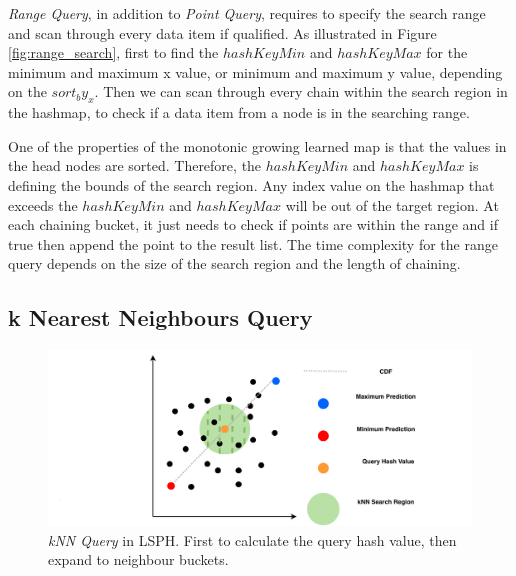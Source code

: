 \textit{Range Query}, in addition to \textit{Point Query}, requires to specify the search range and scan through every data item if qualified. As illustrated in Figure \ref{fig:range_search}, first to find the $hashKeyMin$ and $hashKeyMax$ for the minimum and maximum x value, or minimum and maximum y value, depending on the $sort_by_x$. Then we can scan through every chain within the search region in the hashmap, to check if a data item from a node is in the searching range.

One of the properties of the monotonic growing learned map is that the values in the head nodes are sorted. Therefore, the $hashKeyMin$ and $hashKeyMax$ is defining the bounds of the search region. Any index value on the hashmap that exceeds the $hashKeyMin$ and $hashKeyMax$ will be out of the target region. At each chaining bucket, it just needs to check if points are within the range and if true then append the point to the result list. The time complexity for the range query depends on the size of the search region and the length of chaining.  



\subsection{k Nearest Neighbours Query}

\begin{figure}[ht]
\centering
\includegraphics[scale=0.65]{Figures/knn.pdf}
\caption{\textit{kNN Query} in LSPH. First to calculate the query hash value, then expand to neighbour buckets.}
\label{fig:knn}
\end{figure}



